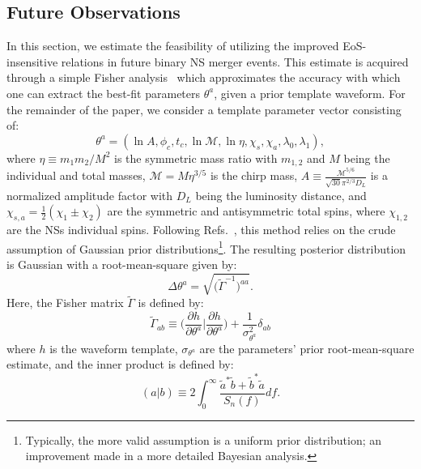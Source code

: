 \documentclass[prd,twocolumn,nofootinbib,superscriptaddress,amsmath,amssymb]{revtex4-1}
\begin{document}
\subsection{Future Observations}\label{sec:futureObservations}
In this section, we estimate the feasibility of utilizing the improved EoS-insensitive relations in future binary NS merger events.
This estimate is acquired through a simple Fisher analysis~\cite{Finn:Fisher,Cutler:Fisher} which approximates the accuracy with which one can extract the best-fit parameters $\theta^a$, given a prior template waveform.
For the remainder of the paper, we consider a template parameter vector consisting of:
\begin{equation}\label{eq:template}
\theta^a=(\ln{A},\phi_c,t_c,\ln{\mathcal{M}},\ln{\mathcal{\eta}},\chi_s,\chi_a,\lambda_0, \lambda_1),
\end{equation}
where $\eta \equiv m_1 m_2/M^2$ is the symmetric mass ratio with $m_{1,2}$ and $M$ being the individual and total masses, $\mathcal{M}=M \eta^{3/5}$ is the chirp mass, $A \equiv \frac{\mathcal{M}^{5/6}}{\sqrt{30}\pi^{2/3}D_L}$ is a normalized amplitude factor with $D_L$ being the luminosity distance, and $\chi_{s,a}=\frac{1}{2}(\chi_1\pm\chi_2)$ are the symmetric and antisymmetric total spins, where $\chi_{1,2}$ are the NSs individual spins. 
Following Refs.~\cite{Cutler:Fisher,Berti:Fisher,Poisson:Fisher}, this method relies on the crude assumption of Gaussian prior distributions\footnote{Typically, the more valid assumption is a uniform prior distribution; an improvement made in a more detailed Bayesian analysis.}.
The resulting posterior distribution is Gaussian with a root-mean-square given by:
\begin{equation}
\Delta \theta^a=\sqrt{\Big( \tilde{\Gamma}^{-1}\Big)^{aa}}.
\end{equation}
Here, the Fisher matrix $\tilde{\Gamma}$ is defined by:
\begin{equation}
\tilde{\Gamma}_{ab} \equiv \Big( \frac{\partial h}{\partial \theta^a} \Big| \frac{\partial h}{\partial \theta^a}\Big) + \frac{1}{\sigma_{\theta^a}^2} \delta_{ab}
\end{equation}
where $h$ is the waveform template, $\sigma_{\theta^a}$ are the parameters' prior root-mean-square estimate, and the inner product is defined by:
\begin{equation}
(a|b) \equiv 2 \int^{\infty}_0\frac{\tilde{a}^*\tilde{b}+\tilde{b}^*\tilde{a}}{S_n(f)}df.
\end{equation}
\end{document}
